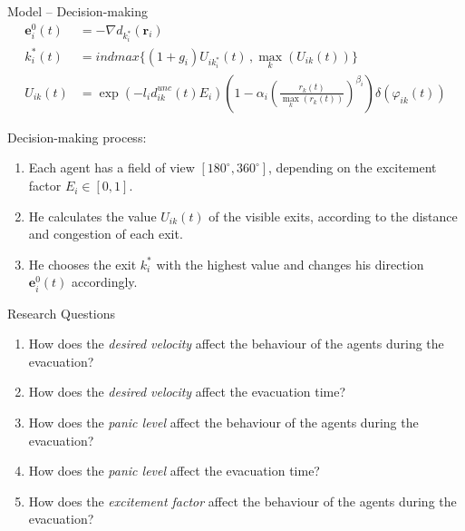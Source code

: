 \documentclass[aspectratio=43]{beamer}
\begin{document}
\begin{frame}{Model -- Decision-making}
	\begin{equation*}
	\begin{split}
		\bm{e}_i^0(t) & = - \nabla d_{k_i^*}(\bm{r}_i) \\
		k_i^*(t) & = indmax\{ (1+g_i) U_{ik_i^*}(t) \,, \max_k\left(U_{ik}(t)\right) \} \\
		U_{ik}(t) & = \exp\left( -l_i d_{ik}^{unc}(t) E_i \right) \left(1-\alpha_i\left(\frac{r_k(t)}{\max_k\left(r_k(t)\right)}\right)^{\beta_i}\right) \delta(\varphi_{ik}(t))
	\end{split}
	\end{equation*}
	
	Decision-making process:
	\begin{enumerate}
		\item Each agent has a field of view $[180^{\circ},360^{\circ}]$, depending on the excitement factor $E_i \in [0,1]$. \\
		\item He calculates the value $U_{ik}(t)$ of the visible exits, according to the distance and congestion of each exit.
		\item He chooses the exit $k_i^*$ with the highest value and changes his direction $\bm{e}_i^0(t)$ accordingly.
	\end{enumerate}
\end{frame}


\begin{frame}{Research Questions}
	\pause
	
	\begin{enumerate}
		\item How does the \emph{desired velocity} affect the behaviour of the agents during the evacuation? \\
		\smallskip
		\item How does the \emph{desired velocity} affect the evacuation time? \\
		\smallskip
		\pause
		\item How does the \emph{panic level} affect the behaviour of the agents during the evacuation? \\
		\smallskip
		\item How does the \emph{panic level} affect the evacuation time? \\
		\smallskip
		\pause
		\item How does the \emph{excitement factor} affect the behaviour of the agents during the evacuation?
	\end{enumerate}
\end{frame}
\end{document}
